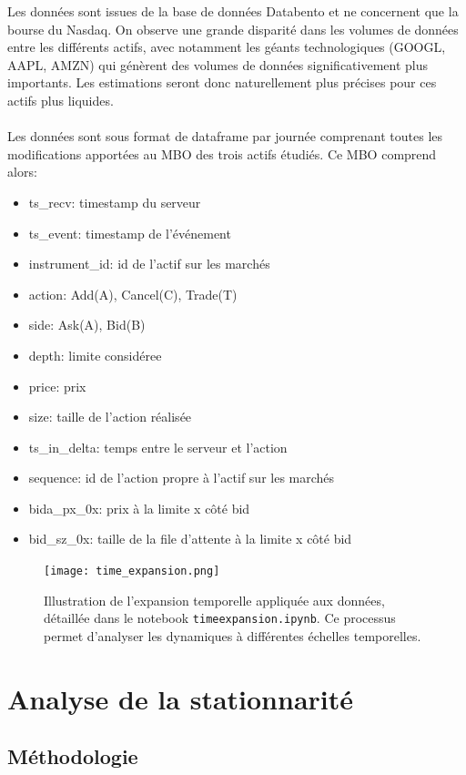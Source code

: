 \documentclass[10pt,a4paper]{article}
\theoremstyle{definition}
\theoremstyle{remark}
\begin{document}
Les données sont issues de la base de données Databento et ne concernent que la bourse du Nasdaq. On observe une grande disparité dans les volumes de données entre les différents actifs, avec notamment les géants technologiques (GOOGL, AAPL, AMZN) qui génèrent des volumes de données significativement plus importants. Les estimations seront donc naturellement plus précises pour ces actifs plus liquides.
\\
\\
Les données sont sous format de dataframe par journée comprenant toutes les modifications apportées au MBO des trois actifs étudiés. Ce MBO comprend alors:
\begin{itemize}
    \item ts\_recv: timestamp du serveur 
    \item ts\_event: timestamp de l'événement     
    \item instrument\_id: id de l'actif sur les marchés
    \item action: Add(A), Cancel(C), Trade(T)
    \item side: Ask(A), Bid(B)
    \item depth: limite considéree
    \item price: prix
    \item size: taille de l'action réalisée
    \item ts\_in\_delta: temps entre le serveur et l'action
    \item sequence: id de l'action propre à l'actif sur les marchés
    \item bid{a}\_px\_0x: prix à la limite x côté bid
    \item bid\_sz\_0x: taille de la file d'attente à la limite x côté bid
\end{itemize}

\begin{figure}[h!]
\centering
    \texttt{[image: time\_expansion.png]}
    \caption{Illustration de l'expansion temporelle appliquée aux données, détaillée dans le notebook \texttt{timeexpansion.ipynb}. Ce processus permet d'analyser les dynamiques à différentes échelles temporelles.}
    \label{fig:time_expansion}
\end{figure}

\newpage
\section{Analyse de la stationnarité}

\subsection{Méthodologie}
\end{document}
